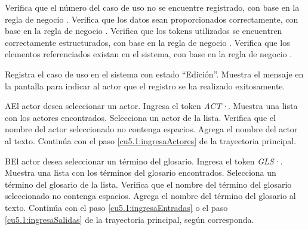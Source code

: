 \begin{UCtrayectoria}
	\UCpaso[\UCsist] Verifica que el número del caso de uso no se encuentre registrado, con base en la regla de negocio  . 
	    \UCpaso[\UCsist] Verifica que los datos sean proporcionados correctamente, con base en la regla de negocio .  
    \UCpaso[\UCsist] Verifica que los tokens utilizados se encuentren correctamente estructurados, con base en la regla de negocio . 
    \UCpaso[\UCsist] Verifica que los elementos referenciados existan en el sistema, con base en la regla de negocio . 
    
    \UCpaso[\UCsist] Registra el caso de uso en el sistema con estado ``Edición''.
    \UCpaso[\UCsist] Muestra el mensaje  en la pantalla  
    para indicar al actor que el registro se ha realizado exitosamente.
 \end{UCtrayectoria}
 
 \begin{UCtrayectoriaA}{A}{El actor desea seleccionar un actor.}
 	\UCpaso[\UCactor] Ingresa el token {\it ACT·}.
 	\UCpaso[\UCsist] Muestra una lista con los actores encontrados.
 	\UCpaso[\UCactor] Selecciona un actor de la lista.
  	\UCpaso[\UCsist] Verifica que el nombre del actor seleccionado no contenga espacios. 
  	\UCpaso[\UCsist] Agrega el nombre del actor al texto.
    \UCpaso[] Continúa con el paso \ref{cu5.1:ingresaActores} de la trayectoria principal.
 \end{UCtrayectoriaA}
 \begin{UCtrayectoriaA}{B}{El actor desea seleccionar un término del glosario.}
 	\UCpaso[\UCactor] Ingresa el token {\it GLS·}.	
 	\UCpaso[\UCsist] Muestra una lista con los términos del glosario encontrados.
 	\UCpaso[\UCactor] Selecciona un término del glosario de la lista.
  	\UCpaso[\UCsist] Verifica que el nombre del término del glosario seleccionado no contenga espacios. 
  	\UCpaso[\UCsist] Agrega el nombre del término del glosario al texto.
    \UCpaso[] Continúa con el paso \ref{cu5.1:ingresaEntradas} o el paso \ref{cu5.1:ingresaSalidas} de la trayectoria principal, según corresponda.
 \end{UCtrayectoriaA}

